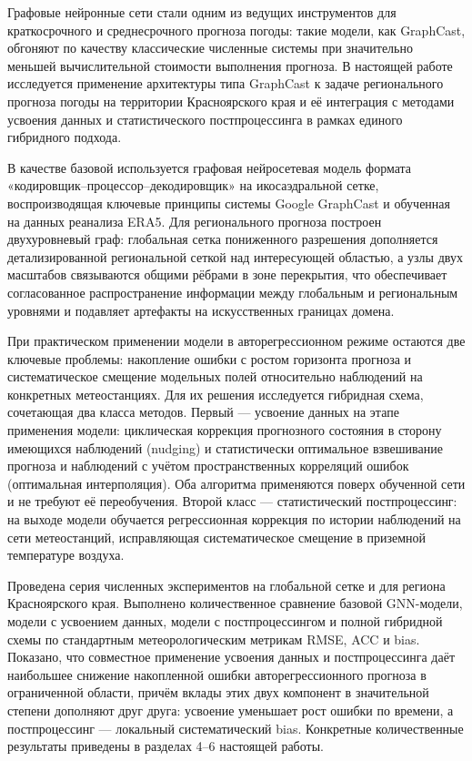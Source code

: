 \documentclass[14pt,a4paper]{extarticle}
\numberwithin{table}{section}
\numberwithin{figure}{section}
\numberwithin{equation}{section}
\begin{document}
Графовые нейронные сети стали одним из ведущих инструментов для
краткосрочного и среднесрочного прогноза погоды: такие модели, как
GraphCast, обгоняют по качеству классические численные системы при
значительно меньшей вычислительной стоимости выполнения прогноза. В
настоящей работе исследуется применение архитектуры типа GraphCast
к задаче регионального прогноза погоды на территории Красноярского
края и её интеграция с методами усвоения данных и статистического
постпроцессинга в рамках единого гибридного подхода.

В качестве базовой используется графовая нейросетевая модель формата
«кодировщик--процессор--декодировщик» на икосаэдральной сетке,
воспроизводящая ключевые принципы системы Google GraphCast и обученная
на данных реанализа ERA5. Для регионального прогноза построен
двухуровневый граф: глобальная сетка пониженного разрешения дополняется
детализированной региональной сеткой над интересующей областью, а узлы
двух масштабов связываются общими рёбрами в зоне перекрытия, что
обеспечивает согласованное распространение информации между глобальным
и региональным уровнями и подавляет артефакты на искусственных границах
домена.

При практическом применении модели в авторегрессионном режиме остаются
две ключевые проблемы: накопление ошибки с ростом горизонта прогноза и
систематическое смещение модельных полей относительно наблюдений на
конкретных метеостанциях. Для их решения исследуется гибридная схема,
сочетающая два класса методов. Первый --- усвоение данных на этапе
применения модели: циклическая коррекция прогнозного состояния в
сторону имеющихся наблюдений (nudging) и статистически оптимальное
взвешивание прогноза и наблюдений с учётом пространственных корреляций
ошибок (оптимальная интерполяция). Оба алгоритма применяются поверх
обученной сети и не требуют её переобучения. Второй класс --- статистический
постпроцессинг: на выходе модели обучается регрессионная коррекция по
истории наблюдений на сети метеостанций, исправляющая систематическое
смещение в приземной температуре воздуха.

Проведена серия численных экспериментов на глобальной сетке и для
региона Красноярского края. Выполнено количественное сравнение базовой
GNN-модели, модели с усвоением данных, модели с постпроцессингом и
полной гибридной схемы по стандартным метеорологическим метрикам RMSE,
ACC и bias. Показано, что совместное применение усвоения данных и
постпроцессинга даёт наибольшее снижение накопленной ошибки
авторегрессионного прогноза в ограниченной области, причём вклады этих
двух компонент в значительной степени дополняют друг друга: усвоение
уменьшает рост ошибки по времени, а постпроцессинг --- локальный
систематический bias. Конкретные количественные результаты приведены в
разделах 4--6 настоящей работы.
\end{document}
